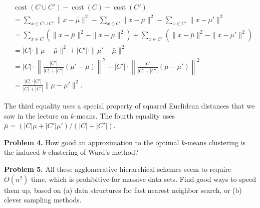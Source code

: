 \documentclass{article}
\begin{document}
\begin{equation*}
\begin{aligned}
&\operatorname{cost}(C \cup C') - \operatorname{cost}(C) - \operatorname{cost}(C') \\
&= \sum_{x \in C \cup C'} \|x - \bar{\mu}\|^{2} - \sum_{x \in C} \|x - \mu\|^{2} - \sum_{x \in C'} \|x - \mu'\|^{2} \\
&= \sum_{x \in C} (\|x - \bar{\mu}\|^{2} - \|x - \mu\|^{2}) + \sum_{x \in C'} (\|x - \bar{\mu}\|^{2} - \|x - \mu'\|^{2}) \\
&= |C| \cdot \|\mu - \bar{\mu}\|^{2} + |C'| \cdot \|\mu' - \bar{\mu}\|^{2} \\
&= |C| \cdot \left\|\frac{|C'|}{|C| + |C'|} (\mu' - \mu)\right\|^{2} + |C'| \cdot \left\|\frac{|C|}{|C| + |C'|} (\mu - \mu')\right\|^{2} \\
&= \frac{|C| \cdot |C'|}{|C| + |C'|} \|\mu - \mu'\|^{2}.
\end{aligned}
\end{equation*}

The third equality uses a special property of squared Euclidean distances that we saw in the lecture on $k$-means. The fourth equality uses $\bar{\mu} = (|C| \mu + |C'| \mu') / (|C| + |C'|)$.

\textbf{Problem 4.} How good an approximation to the optimal $k$-means clustering is the induced $k$-clustering of Ward's method?

\textbf{Problem 5.} All these agglomerative hierarchical schemes seem to require $O(n^{2})$ time, which is prohibitive for massive data sets. Find good ways to speed them up, based on (a) data structures for fast nearest neighbor search, or (b) clever sampling methods.
\end{document}
